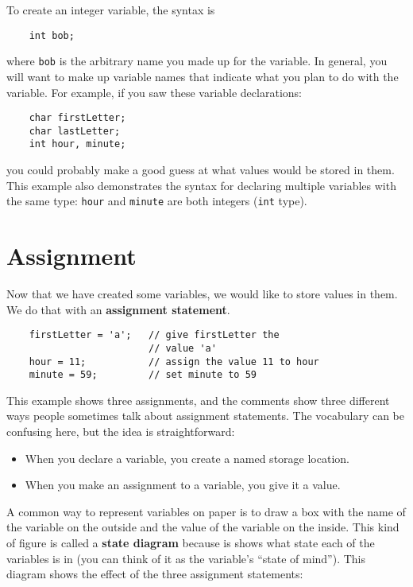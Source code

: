 To create an integer variable, the syntax is 

\begin{lstlisting}
    int bob;
\end{lstlisting}
%
where {\tt bob} is the arbitrary name you made up for the
variable.  In general, you will want to make up variable names
that indicate what you plan to do with the variable.  For
example, if you saw these variable declarations:

\begin{lstlisting}
    char firstLetter;
    char lastLetter;
    int hour, minute;
\end{lstlisting}
%
you could probably make a good guess at what values
would be stored in them.  This example
also demonstrates the syntax for declaring multiple variables
with the same type: {\tt hour} and {\tt minute}
are both integers ({\tt int} type).

\section{Assignment}

Now that we have created some variables, we would like to
store values in them.  We do that with an {\bf assignment
statement}.


\begin{lstlisting}
    firstLetter = 'a';   // give firstLetter the 
                         // value 'a'
    hour = 11;           // assign the value 11 to hour
    minute = 59;         // set minute to 59
\end{lstlisting}
%
This example shows three assignments, and the comments show
three different ways people sometimes talk about assignment
statements.  The vocabulary can be confusing here, but the
idea is straightforward:

\begin{itemize}

\item When you declare a variable, you create a named storage location.

\item When you make an assignment to a variable, you give it a value.

\end{itemize}

A common way to represent variables on paper is to draw a box
with the name of the variable on the outside and the value
of the variable on the inside.  This kind of figure is called
a {\bf state diagram} because is shows what state each of the
variables is in (you can think of it as the variable's ``state of
mind'').
This diagram shows
the effect of the three assignment statements:

